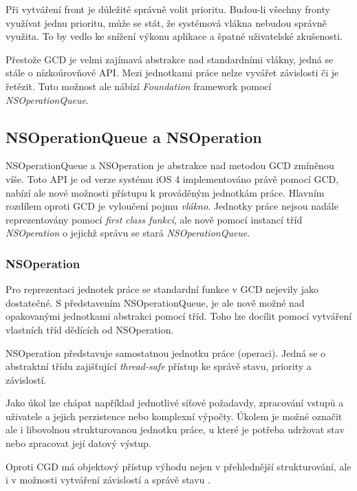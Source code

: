 Při vytváření front je důležité správně volit prioritu.
Budou-li všechny fronty využívat jednu prioritu, může se stát, že systémová vlákna nebudou správně využita.
To by vedlo ke snížení výkonu aplikace a špatné uživatelské zkušenosti.

Přestože GCD je velmi zajímavá abstrakce nad standardními vlákny, jedná se stále o nízkoúrovňové API.
Mezi jednotkami práce nelze vyvářet závislosti či je řetězit.
Tuto možnost ale nábízí \textit{Foundation} framework pomocí \textit{NSOperationQueue}.

\subsection{NSOperationQueue a NSOperation}

NSOperationQueue a NSOperation je abstrakce nad metodou GCD zmíněnou víše.
Toto API je od verze systému iOS 4 implementováno právě pomocí GCD, nabízí ale nové možnosti přístupu k prováděným jednotkám práce.
Hlavním rozdílem oproti GCD je vyloučení pojmu \textit{vlákno}.
Jednotky práce nejsou nadále reprezentovány pomocí \textit{first class funkcí}, ale nově pomocí instancí tříd \textit{NSOperation} o jejichž správu se stará \textit{NSOperationQueue}. \cite{cocoacasts-nsoperation-vs-gcd}

\subsubsection{NSOperation}

Pro reprezentaci jednotek práce se standardní funkce v GCD nejevily jako dostatečné.
S představením NSOperationQueue, je ale nově možné nad opakovanými jednotkami abstrakci pomocí tříd.
Toho lze docílit pomocí vytváření vlastních tříd dědících od NSOperation.

NSOperation představuje samostatnou jednotku práce (operaci).
Jedná se o abstraktní třídu zajišťující \textit{thread-safe} přístup ke správě stavu, priority a závislostí.

Jako úkol lze chápat například jednotlivé síťové požadavdy, zpracování vstupů a uživatele a jejich perzistence nebo komplexní výpočty.
Úkolem je možné označit ale i libovolnou strukturovanou jednotku práce, u které je potřeba udržovat stav nebo zpracovat její datový výstup.

Oproti CGD má objektový přístup výhodu nejen v přehlednější strukturování, ale i v možnosti vytváření závislostí a správě stavu \cite{apple-operation-queues}.

